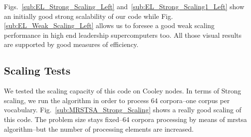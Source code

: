 \documentclass[10pt,journal,compsoc]{IEEEtran}
\begin{document}

Figs.~\ref{sub:EL_Strong_Scaling_Left} and~\ref{sub:EL_Strong_Scaling1_Left} show an initially good strong scalability of our code while Fig. \ref{sub:EL_Weak_Scaling_Left} allows us to foresee a good weak scaling performance in high end leadership supercomputers too. All those visual results are supported by good measures of efficiency.






















\subsection{ Scaling Tests}

We tested the scaling capacity of this code on Cooley nodes. In terms of Strong scaling, we run the algorithm in order to process 64 corpora--one corpus per vocabulary. Fig.~\ref{sub:MRSTSA_Strong_Scaling} shows a really good scaling of this code. The problem size stays fixed--64 corpora processing by means of \gls{mrstsa} algorithm--but the number of processing elements are increased.
\end{document}
